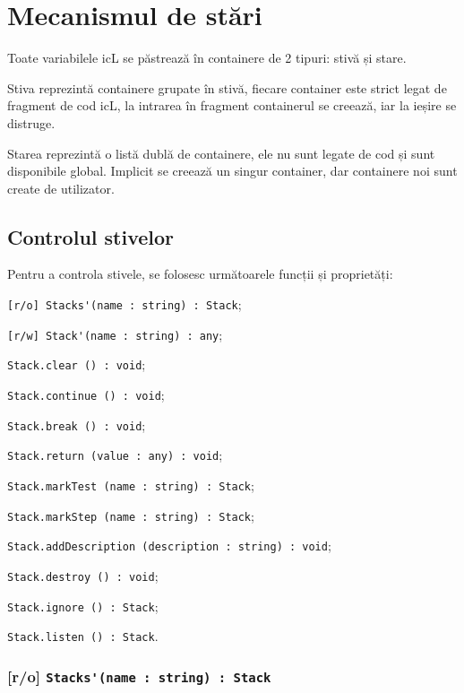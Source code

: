 \section{Mecanismul de stări}

Toate variabilele icL se păstrează în containere de 2 tipuri: stivă și stare.

Stiva reprezintă containere grupate în stivă, fiecare container este strict legat de fragment de cod icL, la intrarea în fragment containerul se creează, iar la ieșire se distruge.

Starea reprezintă o listă dublă de containere, ele nu sunt legate de cod și sunt disponibile global. Implicit se creează un singur container, dar containere noi sunt create de utilizator.

\subsection{Controlul stivelor}
\label{stack:control}

Pentru a controla stivele, se folosesc următoarele funcții și proprietăți:
\begin{icItems}
	\item \lstinline|[r/o] Stacks'(name : string) : Stack|;
	\item \lstinline|[r/w] Stack'(name : string) : any|;
	\item \lstinline|Stack.clear () : void|;
	\item \lstinline|Stack.continue () : void|;
	\item \lstinline|Stack.break () : void|;
	\item \lstinline|Stack.return (value : any) : void|;
	\item \lstinline|Stack.markTest (name : string) : Stack|;
	\item \lstinline|Stack.markStep (name : string) : Stack|;
	\item \lstinline|Stack.addDescription (description : string) : void|;
	\item \lstinline|Stack.destroy () : void|;
	\item \lstinline|Stack.ignore () : Stack|;
	\item \lstinline|Stack.listen () : Stack|.
\end{icItems}

\subsubsection{[r/o] \lstinline|Stacks'(name : string) : Stack|}

